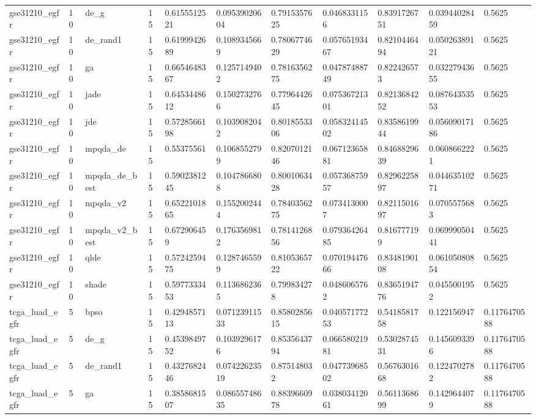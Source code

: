 \begin{table}[t]
\begin{tabular}{lllllllllll}
gse31210\_egfr & 10 & de\_g & 15 & 0.6155512521 & 0.09539020604 & 0.7915357625 & 0.0468331156 & 0.8391726751 & 0.03944028459 & 0.5625 \\
gse31210\_egfr & 10 & de\_rand1 & 15 & 0.6199942689 & 0.1089345669 & 0.7806774629 & 0.05765193467 & 0.8210446494 & 0.05026389121 & 0.5625 \\
gse31210\_egfr & 10 & ga & 15 & 0.6654648367 & 0.1257149402 & 0.7816356275 & 0.04787488749 & 0.822426573 & 0.03227943655 & 0.5625 \\
gse31210\_egfr & 10 & jade & 15 & 0.6453448612 & 0.1502732766 & 0.7796442645 & 0.07536721301 & 0.8213684252 & 0.08764353553 & 0.5625 \\
gse31210\_egfr & 10 & jde & 15 & 0.5728566198 & 0.1039082042 & 0.8018553306 & 0.05832414502 & 0.8358619944 & 0.05609017186 & 0.5625 \\
gse31210\_egfr & 10 & mpqda\_de & 15 & 0.55375561 & 0.1068552799 & 0.8207012146 & 0.06712365881 & 0.8468829639 & 0.0608662221 & 0.5625 \\
gse31210\_egfr & 10 & mpqda\_de\_best & 15 & 0.5902381245 & 0.1047866808 & 0.8001063428 & 0.05736875957 & 0.8296225897 & 0.04463510271 & 0.5625 \\
gse31210\_egfr & 10 & mpqda\_v2 & 15 & 0.6522101865 & 0.1552002444 & 0.7840356275 & 0.0734130007 & 0.8211501697 & 0.0705575683 & 0.5625 \\
gse31210\_egfr & 10 & mpqda\_v2\_best & 15 & 0.672906459 & 0.1763569812 & 0.7814126856 & 0.07936426485 & 0.816777199 & 0.06999050441 & 0.5625 \\
gse31210\_egfr & 10 & qlde & 15 & 0.5724259475 & 0.1287465599 & 0.8105365722 & 0.07019447666 & 0.8348190108 & 0.06105080854 & 0.5625 \\
gse31210\_egfr & 10 & shade & 15 & 0.5977333453 & 0.1136862365 & 0.799834278 & 0.0486065762 & 0.8365194776 & 0.0455001952 & 0.5625 \\
tcga\_luad\_egfr & 5 & bpso & 15 & 0.4294857113 & 0.07123911533 & 0.8580285615 & 0.04057177253 & 0.5418581758 & 0.122156947 & 0.1176470588 \\
tcga\_luad\_egfr & 5 & de\_g & 15 & 0.4539849752 & 0.1039296176 & 0.8535643794 & 0.06658021981 & 0.5302874531 & 0.1456093396 & 0.1176470588 \\
tcga\_luad\_egfr & 5 & de\_rand1 & 15 & 0.4327682446 & 0.07422623519 & 0.875148032 & 0.04773968502 & 0.5676301668 & 0.1224702782 & 0.1176470588 \\
tcga\_luad\_egfr & 5 & ga & 15 & 0.3858681507 & 0.08655748635 & 0.8839660978 & 0.03803412061 & 0.5611368699 & 0.1429644079 & 0.1176470588 \\

\end{tabular}
\end{table}
